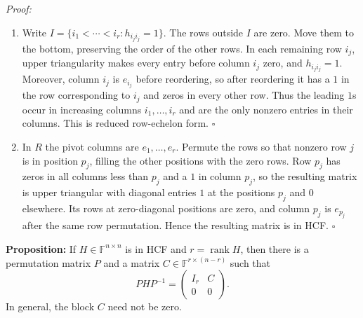 \documentclass[a4paper,11pt,abstract=true]{scrartcl}
\theoremstyle{dotlessP}
\theoremstyle{dotlessS}
\theoremstyle{remark}
\theoremstyle{definition}
\begin{document}
\begin{claim_box}
\textit{Proof:}
\begin{enumerate}
\item Write
$I=\{i_1<\cdots<i_r:h_{i_j i_j}=1\}$. The rows outside $I$ are zero.
Move them to the bottom, preserving the order of the other rows. In
each remaining row $i_j$, upper triangularity makes every entry before
column $i_j$ zero, and $h_{i_j i_j}=1$. Moreover, column $i_j$ is
$e_{i_j}$ before reordering, so after reordering it has a $1$ in the
row corresponding to $i_j$ and zeros in every other row. Thus the
leading $1$s occur in increasing columns $i_1,\ldots,i_r$ and are the
only nonzero entries in their columns. This is reduced row-echelon
form.
\hfill$\square$
\item In $R$ the pivot columns are $e_1,\ldots,e_r$. Permute the
rows so that nonzero row $j$ is in position $p_j$, filling the other
positions with the zero rows. Row $p_j$ has zeros in all columns less
than $p_j$ and a $1$ in column $p_j$, so the resulting matrix is upper
triangular with diagonal entries $1$ at the positions $p_j$ and $0$
elsewhere. Its rows at zero-diagonal positions are zero, and column
$p_j$ is $e_{p_j}$ after the same row permutation. Hence the resulting
matrix is in HCF.
\hfill$\square$
\end{enumerate}
\end{claim_box}

\begin{problem_box}
\textbf{Proposition:} If $H\in\mathbb{F}^{n\times n}$ is in HCF and
$r=\operatorname{rank}H$, then there is a permutation matrix $P$ and a
matrix $C\in\mathbb{F}^{r\times(n-r)}$ such that
\[
PHP^{-1}=\begin{pmatrix}I_r&C\\0&0\end{pmatrix}.
\]
In general, the block $C$ need not be zero.
\end{problem_box}
\end{document}
